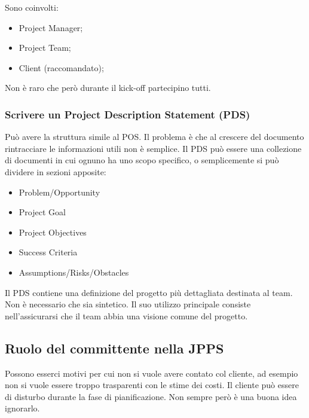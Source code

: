 Sono coinvolti:
\begin{itemize}
	\item Project Manager;
	\item Project Team;
	\item Client (raccomandato);
\end{itemize}
Non è raro che però durante il kick-off partecipino tutti.

\subsubsection{Scrivere un Project Description Statement (PDS)}
Può avere la struttura simile al POS. Il problema è che al crescere del documento rintracciare le informazioni utili non è semplice. Il PDS può essere una collezione di documenti in cui ognuno ha uno scopo specifico, o semplicemente si può dividere in sezioni apposite:
\begin{itemize}
	\item Problem/Opportunity
	\item Project Goal
	\item Project Objectives
	\item Success Criteria
	\item Assumptions/Risks/Obstacles
\end{itemize}
Il PDS contiene una definizione del progetto più dettagliata destinata al team. Non è necessario che sia sintetico. Il suo utilizzo principale consiste nell'assicurarsi che il team abbia una visione comune del progetto.
\subsection{Ruolo del committente nella JPPS}
Possono esserci motivi per cui non si vuole avere contato col cliente, ad esempio non si vuole essere troppo trasparenti con le stime dei costi. Il cliente può essere di disturbo durante la fase di pianificazione. Non sempre però è una buona idea ignorarlo.

